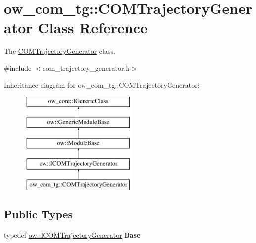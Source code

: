 \hypertarget{classow__com__tg_1_1COMTrajectoryGenerator}{}\section{ow\+\_\+com\+\_\+tg\+:\+:C\+O\+M\+Trajectory\+Generator Class Reference}
\label{classow__com__tg_1_1COMTrajectoryGenerator}


The \hyperlink{classow__com__tg_1_1COMTrajectoryGenerator}{C\+O\+M\+Trajectory\+Generator} class.  




{\ttfamily \#include $<$com\+\_\+trajectory\+\_\+generator.\+h$>$}

Inheritance diagram for ow\+\_\+com\+\_\+tg\+:\+:C\+O\+M\+Trajectory\+Generator\+:\begin{figure}[H]
\begin{center}
\leavevmode
\includegraphics[height=5.000000cm]{dc/d73/classow__com__tg_1_1COMTrajectoryGenerator}
\end{center}
\end{figure}
\subsection*{Public Types}
\begin{DoxyCompactItemize}
\item 
typedef \hyperlink{classow_1_1ICOMTrajectoryGenerator}{ow\+::\+I\+C\+O\+M\+Trajectory\+Generator} {\bfseries Base}\hypertarget{classow__com__tg_1_1COMTrajectoryGenerator_af8c347044bd434749420741f0f569094}{}\label{classow__com__tg_1_1COMTrajectoryGenerator_af8c347044bd434749420741f0f569094}

\end{DoxyCompactItemize}

